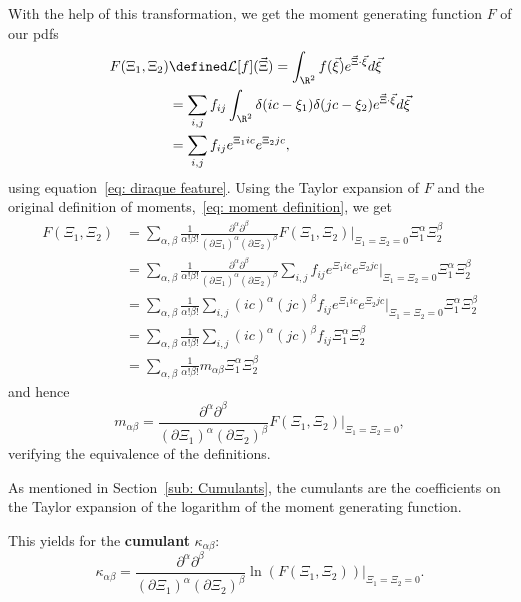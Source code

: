 With the help of this transformation, we get the moment generating function $F$ of our \glspl{pdf}
\begin{equation}
  \label{eq:Definition of F}
  \begin{aligned}
    F(\Xi_1, \Xi_2) & \defined \mathcal{L}[f](\vec{\Xi}) = \int_{\R^2} f(\vec{\xi}) e^{\vec{\Xi} \cdot \vec{\xi}}d\vec{\xi} \\
     & = \sum_{i,j}f_{ij} \int_{\R^2} \delta(ic - \xi_1)\delta(jc - \xi_2) e^{\vec{\Xi} \cdot \vec{\xi}}d\vec{\xi}
  \\
     & = \sum_{i,j}f_{ij} e^{\Xi_1 ic} e^{\Xi_2 jc},
  \end{aligned}
\end{equation}
using equation~\eqref{eq: diraque feature}.
Using the Taylor expansion of $F$ and the original definition of moments,~\eqref{eq: moment definition}, we get
\begin{equation}
  \label{eq: taylor of F}
  \begin{aligned}
    F(\Xi_1, \Xi_2) & = \sum_{\alpha,\beta} \frac{1}{\alpha!\beta!} \frac{\partial^\alpha\partial^\beta}{{(\partial \Xi_1)}^\alpha{(\partial \Xi_2)}^\beta} F(\Xi_1, \Xi_2)\Bigr|_{\Xi_1=\Xi_2 = 0} \Xi_1^\alpha \Xi_2^\beta \\
    & = \sum_{\alpha,\beta} \frac{1}{\alpha!\beta!} \frac{\partial^\alpha\partial^\beta}
      {{(\partial \Xi_1)}^\alpha{(\partial \Xi_2)}^\beta}  \sum_{i,j} f_{ij} e^{\Xi_1 ic} e^{\Xi_2 jc} \Bigr|_{\Xi_1=\Xi_2 = 0} \Xi_1^\alpha \Xi_2^\beta \\
    & = \sum_{\alpha,\beta} \frac{1}{\alpha!\beta!}
    \sum_{i,j}  {(ic)}^\alpha {(jc)}^\beta f_{ij} e^{\Xi_1 ic} e^{\Xi_2 jc} \Bigr|_{\Xi_1=\Xi_2 = 0} \Xi_1^\alpha \Xi_2^\beta \\
    & = \sum_{\alpha,\beta} \frac{1}{\alpha!\beta!}
    \sum_{i,j} {(ic)}^\alpha {(jc)}^\beta f_{ij} \Xi_1^\alpha \Xi_2^\beta \\
    & = \sum_{\alpha,\beta} \frac{1}{\alpha!\beta!} m_{\alpha\beta} \Xi_1^\alpha \Xi_2^\beta
  \end{aligned}
\end{equation}
and hence
\begin{equation}
  \label{eq: alternative representation of moments}
  m_{\alpha\beta} = \frac{\partial^\alpha\partial^\beta}{{(\partial \Xi_1)}^\alpha{(\partial \Xi_2)}^\beta} F(\Xi_1, \Xi_2)\Bigr|_{\Xi_1=\Xi_2 = 0},
\end{equation}
verifying the equivalence of the definitions.

As mentioned in Section~\ref{sub: Cumulants}, the cumulants are the coefficients on the Taylor expansion of the logarithm of the moment generating function.

This yields for the \textbf{cumulant} $\kappa_{\alpha\beta}$:
\begin{equation}
  \label{eq: definition of cumulants}
  \kappa_{\alpha\beta} = \frac{\partial^\alpha\partial^\beta}{{(\partial \Xi_1)}^\alpha{(\partial \Xi_2)}^\beta} \ln(F(\Xi_1, \Xi_2))\Bigr|_{\Xi_1=\Xi_2 = 0}.
\end{equation}

